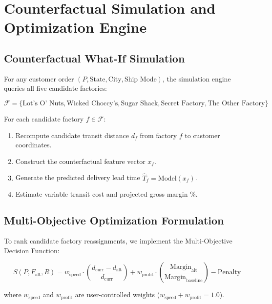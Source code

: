 \documentclass[12pt]{article}
\begin{document}
\newpage

\section{Counterfactual Simulation and Optimization Engine}

\subsection{Counterfactual What-If Simulation}

For any customer order $(P, \text{State}, \text{City}, \text{Ship Mode})$, the simulation engine queries all five candidate factories:

$$\mathcal{F} = \{\text{Lot's O' Nuts}, \text{Wicked Choccy's}, \text{Sugar Shack}, \text{Secret Factory}, \text{The Other Factory}\}$$

For each candidate factory $f \in \mathcal{F}$:
\begin{enumerate}
    \item Recompute candidate transit distance $d_f$ from factory $f$ to customer coordinates.
    \item Construct the counterfactual feature vector $x_f$.
    \item Generate the predicted delivery lead time $\hat{T}_f = \text{Model}(x_f)$.
    \item Estimate variable transit cost and projected gross margin $\%$.
\end{enumerate}

\subsection{Multi-Objective Optimization Formulation}

To rank candidate factory reassignments, we implement the Multi-Objective Decision Function:

$$S(P, F_{\text{alt}}, R) = w_{\text{speed}} \cdot \left(\frac{d_{\text{curr}} - d_{\text{alt}}}{d_{\text{curr}}}\right) + w_{\text{profit}} \cdot \left(\frac{\text{Margin}_{\text{alt}}}{\text{Margin}_{\text{baseline}}}\right) - \text{Penalty}$$

where $w_{\text{speed}}$ and $w_{\text{profit}}$ are user-controlled weights ($w_{\text{speed}} + w_{\text{profit}} = 1.0$).
\end{document}
